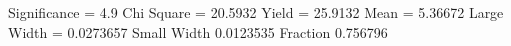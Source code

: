 Significance = 4.9
Chi Square = 20.5932
Yield = 25.9132
Mean = 5.36672
Large Width = 0.0273657
Small Width 0.0123535
Fraction 0.756796
